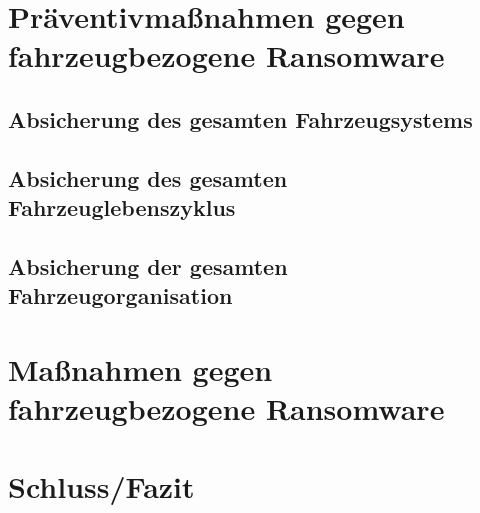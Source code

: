 \documentclass[oneside, 11pt, notitlepage, a4paper, numbers=noenddot]{scrartcl}
\begin{document}
\section{Präventivmaßnahmen gegen fahrzeugbezogene Ransomware}

\subsection{Absicherung des gesamten Fahrzeugsystems}

\subsection{Absicherung des gesamten Fahrzeuglebenszyklus}

\subsection{Absicherung der gesamten Fahrzeugorganisation}

\section{Maßnahmen gegen fahrzeugbezogene Ransomware}


\section{Schluss/Fazit}

\end{document}
